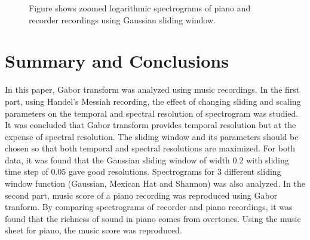 \documentclass{article}
\begin{document}
\begin{figure}[!h]
\caption{Figure shows zoomed logarithmic spectrograms of piano and recorder recordings using Gaussian sliding window.}
\label{fig:zspectrogram}
\end{figure}

\section{Summary and Conclusions}
In this paper, Gabor transform was analyzed using music recordings. In the first part, using Handel's Messiah recording, the effect of changing sliding and scaling parameters on the temporal and spectral resolution of spectrogram was studied. It was concluded that Gabor transform provides temporal resolution but at the expense of spectral resolution. The sliding window and its parameters should be chosen so that both temporal and spectral resolutions are maximized. For both data, it was found that the Gaussian sliding window of width $0.2$ with sliding time step of $0.05$ gave good resolutions. Spectrograms for $3$ different sliding window function (Gaussian, Mexican Hat and Shannon) was also analyzed. In the second part, music score of a piano recording was reproduced using Gabor tranform. By comparing spectrograms of recorder and piano recordings, it was found that the richness of sound in piano comes from overtones. Using the music sheet for piano, the music score was reproduced.
\end{document}
